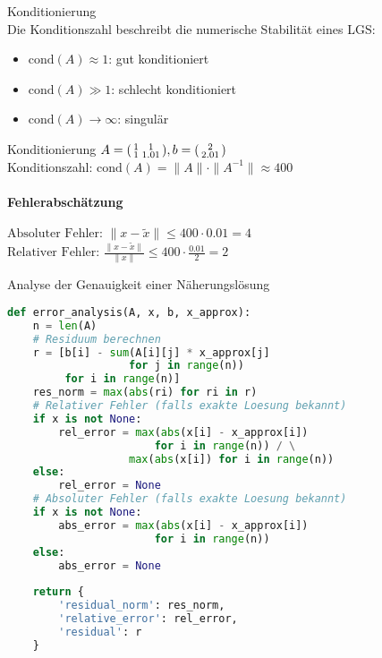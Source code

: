 \begin{concept}{Konditionierung}\\
Die Konditionszahl beschreibt die numerische Stabilität eines LGS:
\begin{itemize}
    \item $\text{cond}(A) \approx 1$: gut konditioniert
    \item $\text{cond}(A) \gg 1$: schlecht konditioniert
    \item $\text{cond}(A) \to \infty$: singulär
\end{itemize}
\end{concept}

\begin{example2}{Konditionierung}
$A = \begin{psmallmatrix}
1 & 1\\
1 & 1.01
\end{psmallmatrix}, b = \begin{psmallmatrix}
2\\
2.01
\end{psmallmatrix}$\\
Konditionszahl:
$\text{cond}(A) = \|A\| \cdot \|A^{-1}\| \approx 400$
\paragraph{Fehlerabschätzung}
$\text{Absoluter Fehler: }\|x - \tilde{x}\| \leq 400 \cdot 0.01 = 4$ \\
$\text{Relativer Fehler: }\frac{\|x - \tilde{x}\|}{\|x\|} \leq 400 \cdot \frac{0.01}{2} = 2$
\end{example2}

\begin{examplecode}{Analyse der Genauigkeit einer Näherungslösung}
\begin{lstlisting}[language=Python, style=basesmol]
def error_analysis(A, x, b, x_approx):
    n = len(A)
    # Residuum berechnen
    r = [b[i] - sum(A[i][j] * x_approx[j] 
                   for j in range(n)) 
         for i in range(n)]
    res_norm = max(abs(ri) for ri in r)
    # Relativer Fehler (falls exakte Loesung bekannt)
    if x is not None:
        rel_error = max(abs(x[i] - x_approx[i]) 
                       for i in range(n)) / \
                   max(abs(x[i]) for i in range(n))
    else:
        rel_error = None
    # Absoluter Fehler (falls exakte Loesung bekannt)
    if x is not None:
        abs_error = max(abs(x[i] - x_approx[i]) 
                       for i in range(n))
    else:
        abs_error = None
    
    return {
        'residual_norm': res_norm,
        'relative_error': rel_error,
        'residual': r
    }
\end{lstlisting}
\end{examplecode}

